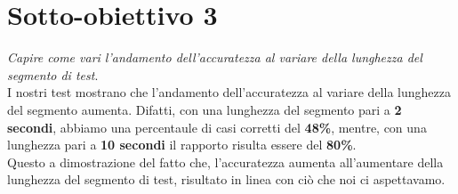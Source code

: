 \documentclass[a4paper, 12pt]{article}
\begin{document}
\section{Sotto-obiettivo 3}
\emph{Capire come vari l'andamento dell'accuratezza al variare della lunghezza del segmento di test}. \\

I nostri test mostrano che l'andamento dell'accuratezza al variare della lunghezza del segmento aumenta. Difatti, con una lunghezza del segmento pari a \textbf{2 secondi}, abbiamo una percentaule di casi corretti del \textbf{48\%}, mentre, con una lunghezza pari a \textbf{10 secondi} il rapporto risulta essere del \textbf{80\%}. \\

Questo a dimostrazione del fatto che, l'accuratezza aumenta all'aumentare della lunghezza del segmento di test, risultato in linea con ciò che noi ci aspettavamo.
\end{document}
